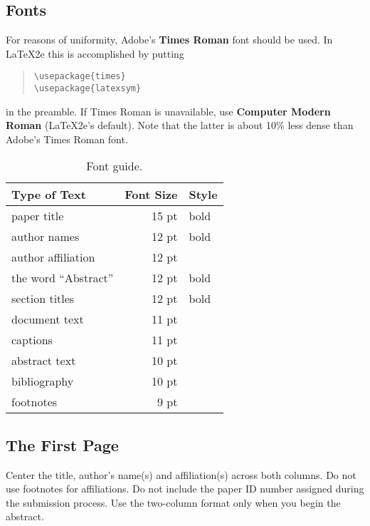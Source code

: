 \documentclass[11pt,a4paper]{article}
\begin{document}
\subsection{Fonts}

For reasons of uniformity, Adobe's {\bf Times Roman} font should be
used. In \LaTeX2e{} this is accomplished by putting

\begin{quote}
\begin{verbatim}
\usepackage{times}
\usepackage{latexsym}
\end{verbatim}
\end{quote}
in the preamble. If Times Roman is unavailable, use {\bf Computer
  Modern Roman} (\LaTeX2e{}'s default).  Note that the latter is about
  10\% less dense than Adobe's Times Roman font.

\begin{table}[h]
\begin{center}
\begin{tabular}{|l|rl|}
\hline \bf Type of Text & \bf Font Size & \bf Style \\ \hline
paper title & 15 pt & bold \\
author names & 12 pt & bold \\
author affiliation & 12 pt & \\
the word ``Abstract'' & 12 pt & bold \\
section titles & 12 pt & bold \\
document text & 11 pt  &\\
captions & 11 pt & \\
abstract text & 10 pt & \\
bibliography & 10 pt & \\
footnotes & 9 pt & \\
\hline
\end{tabular}
\end{center}
\caption{\label{font-table} Font guide. }
\end{table}

\subsection{The First Page}
\label{ssec:first}

Center the title, author's name(s) and affiliation(s) across both
columns. Do not use footnotes for affiliations. Do not include the
paper ID number assigned during the submission process. Use the
two-column format only when you begin the abstract.
\end{document}
